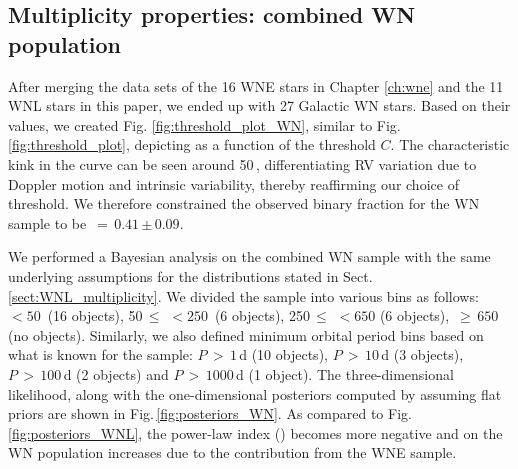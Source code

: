 \subsection{Multiplicity properties: combined WN population}  \label{sect:WN_multiplicity}
After merging the data sets of the 16 WNE stars in Chapter \ref{ch:wne} and the 11 WNL stars in this paper, we ended up with 27 Galactic WN stars. Based on their \DelRV{} values, we created Fig. \ref{fig:threshold_plot_WN}, similar to Fig. \ref{fig:threshold_plot}, depicting \fobsWN{} as a function of the threshold $C$. The characteristic kink in the curve can be seen around 50\,\kms{}, differentiating RV variation due to Doppler motion and intrinsic variability, thereby reaffirming our choice of threshold. We therefore constrained the observed binary fraction for the WN sample to be \fobsWN{}\,$=\,0.41$\,$\pm$\,$0.09$. 

We performed a Bayesian analysis on the combined WN sample with the same underlying assumptions for the distributions stated in Sect. \ref{sect:WNL_multiplicity}. We divided the sample into various \DelRV{} bins as follows: \DelRV{}\,$< 50\,$\kms{} (16 objects), 50\,$\le$\,\DelRV{}\,$<250\,$\kms{} (6 objects), 250\,$\le$\,\DelRV{}\,$<650$ (6 objects), \DelRV{}\,$\ge\,650$\,\kms{} (no objects). Similarly, we also defined minimum orbital period bins based on what is known for the sample: $P\,>\,1\,$d (10 objects), $P\,>\,10\,$d (3 objects), $P\,>\,100\,$d (2 objects) and $P\,>\,1000\,$d (1 object). The three-dimensional likelihood, along with the one-dimensional posteriors computed by assuming flat priors are shown in Fig.\,\ref{fig:posteriors_WN}. As compared to Fig.\,\ref{fig:posteriors_WNL}, the power-law index (\piWN{}) becomes more negative and \fintWN{} on the WN population increases due to the contribution from the WNE sample. 


